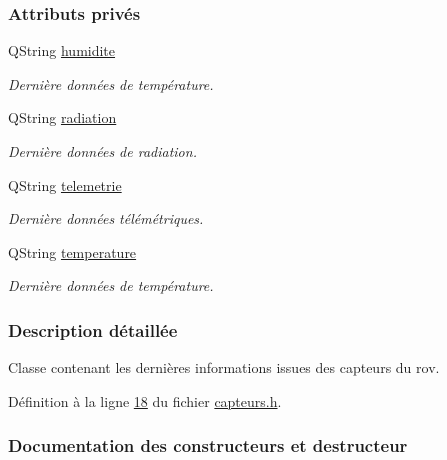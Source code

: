 \subsubsection*{Attributs privés}
\begin{DoxyCompactItemize}
\item 
Q\+String \hyperlink{class_capteurs_a8967c76dbc9c1f2ff8339cb8f00c3adb}{humidite}
\begin{DoxyCompactList}\small\item\em Dernière données de température. \end{DoxyCompactList}\item 
Q\+String \hyperlink{class_capteurs_ad9d6f3fd6cc164c6cd5908fd7822f307}{radiation}
\begin{DoxyCompactList}\small\item\em Dernière données de radiation. \end{DoxyCompactList}\item 
Q\+String \hyperlink{class_capteurs_a336a4c4ad6ae1a49d21b265d2953e24b}{telemetrie}
\begin{DoxyCompactList}\small\item\em Dernière données télémétriques. \end{DoxyCompactList}\item 
Q\+String \hyperlink{class_capteurs_acf6f97c1e121ae0f53c9a56430d42dfe}{temperature}
\begin{DoxyCompactList}\small\item\em Dernière données de température. \end{DoxyCompactList}\end{DoxyCompactItemize}


\subsubsection{Description détaillée}
Classe contenant les dernières informations issues des capteurs du rov. 

Définition à la ligne \hyperlink{capteurs_8h_source_l00018}{18} du fichier \hyperlink{capteurs_8h_source}{capteurs.\+h}.



\subsubsection{Documentation des constructeurs et destructeur}
\mbox{\label{class_capteurs_a9d34c185400db797961c72498c48bbc0}} 
